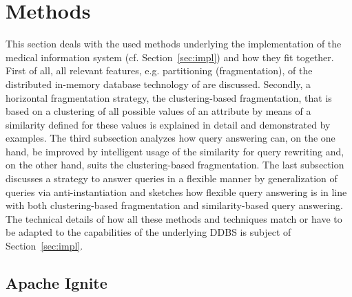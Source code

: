 
\section{Methods}
\label{sec:meth}
 
This section deals with the used methods underlying the implementation of the medical information system (cf. Section~\ref{sec:impl}) and how they fit 
together. First of all, all relevant features, e.g. partitioning (fragmentation), of the distributed in-memory database technology of 
are discussed. Secondly, a horizontal fragmentation strategy, the clustering-based fragmentation, that is based on a clustering of all possible values of 
an attribute by means of a similarity defined for these values is explained in detail and demonstrated by examples. The third subsection analyzes how query 
answering can, on the one hand, be improved by intelligent usage of the similarity for query rewriting and, on the other hand, suits the clustering-based
fragmentation. The last subsection discusses a strategy to answer queries in a flexible manner by generalization of queries via anti-instantiation 
and sketches how flexible query answering is in line with both clustering-based fragmentation and similarity-based query answering. The technical
details of how all these methods and techniques match or have to be adapted to the capabilities of the underlying DDBS is subject of Section~\ref{sec:impl}.

\subsection{Apache Ignite}
\label{sec:meth_ign}

